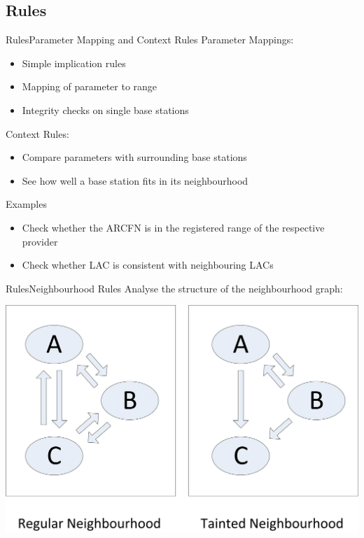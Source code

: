 \documentclass{beamer}
\begin{document}
\subsection{Rules}
\begin{frame}{Rules}{Parameter Mapping and Context Rules}
Parameter Mappings:
\begin{itemize}
	\item Simple implication rules
	\item Mapping of parameter to range
	\item Integrity checks on single base stations
\end{itemize}
Context Rules:
\begin{itemize}
	\item Compare parameters with surrounding base stations
	\item See how well a base station fits in its neighbourhood
\end{itemize}
\begin{exampleblock}{Examples}
\begin{itemize}
	\item Check whether the ARCFN is in the registered range of the respective provider
	\item Check whether LAC is consistent with neighbouring LACs
\end{itemize}
\end{exampleblock}
\end{frame}

\begin{frame}{Rules}{Neighbourhood Rules}
Analyse the structure of the neighbourhood graph:
\begin{center}
\includegraphics[width=.9\textwidth]{Neighbours}
\end{center}
\end{frame}
\end{document}
